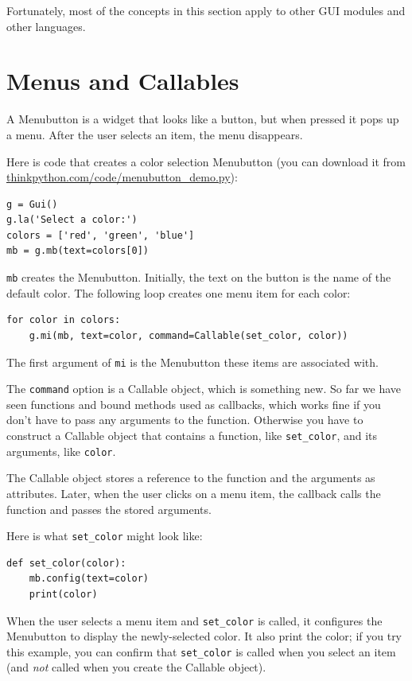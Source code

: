 \documentclass[10pt]{book}
\begin{document}

Fortunately, most of the concepts in this section apply to
other GUI modules and other languages.


\section{Menus and Callables}


A Menubutton is a widget that looks like a button, but when pressed
it pops up a menu.  After the user selects an item, the menu
disappears.

Here is code that creates a color selection Menubutton
(you can download it from \url{thinkpython.com/code/menubutton_demo.py}):


\beforeverb
\begin{verbatim}
g = Gui()
g.la('Select a color:')
colors = ['red', 'green', 'blue']
mb = g.mb(text=colors[0])
\end{verbatim}
\afterverb
%
{\tt mb} creates the Menubutton.  Initially, the text on the button is
the name of the default color.  The following loop creates one menu
item for each color:

\beforeverb
\begin{verbatim}
for color in colors:
    g.mi(mb, text=color, command=Callable(set_color, color))
\end{verbatim}
\afterverb
%
The first argument of {\tt mi} is the Menubutton these items are
associated with.


The {\tt command} option is a Callable object, which is something new.
So far we have seen functions and bound methods used as callbacks,
which works fine if you don't have to pass any arguments to
the function.  Otherwise you have to construct a Callable object
that contains a function, like \verb"set_color", and its arguments,
like {\tt color}.

The Callable object stores a reference to the function and the
arguments as attributes.  Later, when the user clicks on a menu
item, the callback calls the function and passes the stored
arguments.

Here is what \verb"set_color" might look like:

\beforeverb
\begin{verbatim}
def set_color(color):
    mb.config(text=color)
    print(color)
\end{verbatim}
\afterverb
%
When the user selects a menu item and \verb"set_color" is called,
it configures the Menubutton to display the newly-selected color.
It also print the color; if you try this example, you can confirm that
\verb"set_color" is called when you select an item (and {\em not}
called when you create the Callable object).
\end{document}
